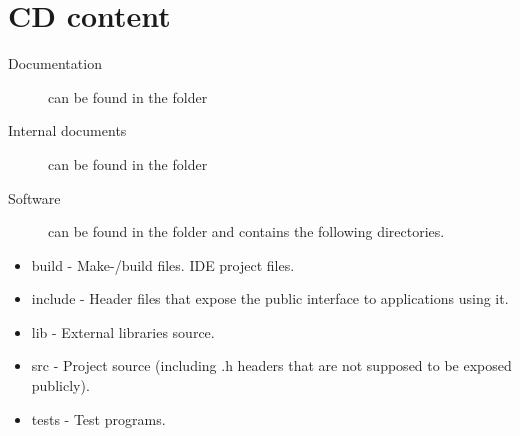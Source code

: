 \chapter{CD content}

\begin{description}
\item[Documentation] can be found in the folder 
\item[Internal documents] can be found in the folder 
\item[Software] can be found in the folder  and contains the following directories.
\end{description}

\begin{itemize}
\item build - Make-/build files. IDE project files.
\item include - Header files that expose the public interface to applications using it.
\item lib - External libraries source.
\item src - Project source (including .h headers that are not supposed to be exposed publicly).
\item tests - Test programs.
\end{itemize}